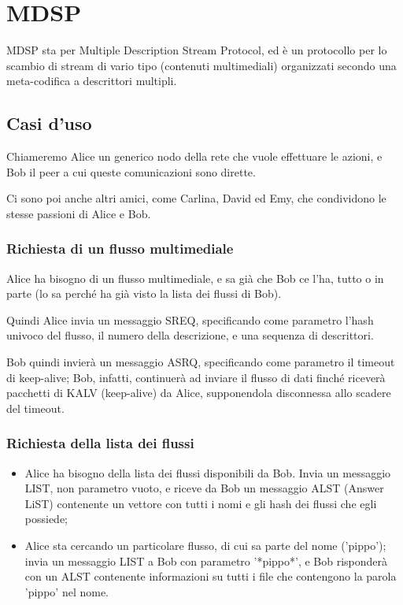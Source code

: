 \section{MDSP}


MDSP sta per Multiple Description Stream Protocol, ed è un protocollo per lo
scambio di stream di vario tipo (contenuti multimediali) organizzati secondo una
meta-codifica a descrittori multipli.


\subsection{Casi d'uso}


Chiameremo Alice un generico nodo della rete che vuole effettuare le azioni, e
Bob il peer a cui queste comunicazioni sono dirette.

Ci sono poi anche altri amici, come Carlina, David ed Emy, che condividono le
stesse passioni di Alice e Bob.


\subsubsection{Richiesta di un flusso multimediale}
%

Alice ha bisogno di un flusso multimediale, e sa già che Bob ce l'ha, tutto o in
parte (lo sa perché ha già visto la lista dei flussi di Bob).

Quindi Alice invia un messaggio SREQ, specificando come parametro l'hash univoco
del flusso, il numero della descrizione, e una sequenza di descrittori.

Bob quindi invierà un messaggio ASRQ, specificando come parametro il timeout di
keep-alive; Bob, infatti, continuerà ad inviare il flusso di dati finché riceverà
pacchetti di KALV (keep-alive) da Alice, supponendola disconnessa allo scadere
del timeout.






\subsubsection{Richiesta della lista dei flussi}
%

\begin{itemize}
\item Alice ha bisogno della lista dei flussi disponibili da Bob. Invia un messaggio LIST, non parametro vuoto, e riceve da Bob un messaggio ALST (Answer LiST) contenente un vettore con tutti i nomi e gli hash dei flussi che egli possiede;
\item Alice sta cercando un particolare flusso, di cui sa parte del nome
('pippo'); invia un messaggio LIST a Bob con parametro '*pippo*', e Bob
risponderà con un ALST contenente informazioni su tutti i file che contengono la
parola 'pippo' nel nome.
\end{itemize}




